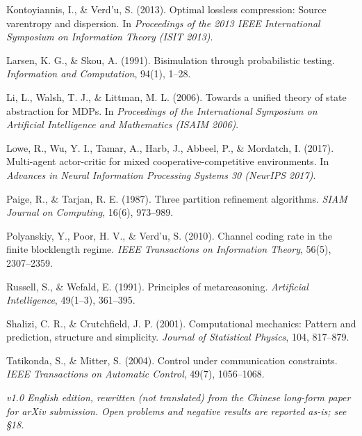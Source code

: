 \documentclass[11pt]{article}
\begin{document}
Kontoyiannis, I., \& Verd'u, S. (2013). Optimal lossless compression: Source varentropy and dispersion. In \emph{Proceedings of the 2013 IEEE International Symposium on Information Theory (ISIT 2013)}.

Larsen, K. G., \& Skou, A. (1991). Bisimulation through probabilistic testing. \emph{Information and Computation}, 94(1), 1--28.

Li, L., Walsh, T. J., \& Littman, M. L. (2006). Towards a unified theory of state abstraction for MDPs. In \emph{Proceedings of the International Symposium on Artificial Intelligence and Mathematics (ISAIM 2006)}.

Lowe, R., Wu, Y. I., Tamar, A., Harb, J., Abbeel, P., \& Mordatch, I. (2017). Multi-agent actor-critic for mixed cooperative-competitive environments. In \emph{Advances in Neural Information Processing Systems 30 (NeurIPS 2017)}.

Paige, R., \& Tarjan, R. E. (1987). Three partition refinement algorithms. \emph{SIAM Journal on Computing}, 16(6), 973--989.

Polyanskiy, Y., Poor, H. V., \& Verd'u, S. (2010). Channel coding rate in the finite blocklength regime. \emph{IEEE Transactions on Information Theory}, 56(5), 2307--2359.

Russell, S., \& Wefald, E. (1991). Principles of metareasoning. \emph{Artificial Intelligence}, 49(1--3), 361--395.

Shalizi, C. R., \& Crutchfield, J. P. (2001). Computational mechanics: Pattern and prediction, structure and simplicity. \emph{Journal of Statistical Physics}, 104, 817--879.

Tatikonda, S., \& Mitter, S. (2004). Control under communication constraints. \emph{IEEE Transactions on Automatic Control}, 49(7), 1056--1068.

\emph{v1.0 \textperiodcentered{} English edition, rewritten (not translated) from the Chinese long-form paper for arXiv submission. Open problems and negative results are reported as-is; see \S{}18.}
\end{document}
